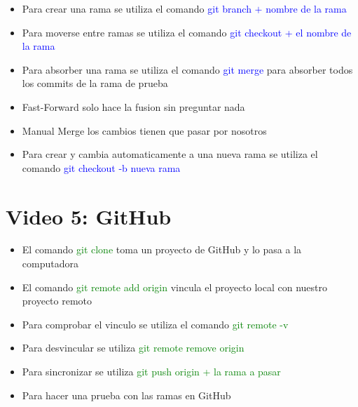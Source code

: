 \documentclass{article}
\begin{document}
	\begin{itemize}
	\item Para crear una rama se utiliza el comando \textcolor{blue}{git branch $+$ nombre de la rama}
	\item Para moverse entre ramas se utiliza el comando \textcolor{blue}{git checkout + el nombre de la rama}
	\item Para absorber una rama se utiliza el comando \textcolor{blue}{git merge} para absorber todos los commits de la rama de prueba
	\item Fast-Forward solo hace la fusion sin preguntar nada
	\item Manual Merge los cambios tienen que pasar por nosotros
	\item Para crear y cambia automaticamente a una nueva rama se utiliza el comando \textcolor{blue}{git checkout -b nueva rama}
	\end{itemize}

	\section{Video 5: GitHub}
	
	\begin{itemize}
		
	\item El comando \textcolor{green}{git clone} toma un proyecto de GitHub y lo pasa a la computadora
	\item El comando \textcolor{green}{git remote add origin} vincula el proyecto local con nuestro proyecto remoto
	\item Para comprobar el vinculo se utiliza el comando \textcolor{green}{git remote -v}
	\item Para desvincular se utiliza \textcolor{green}{git remote remove origin}
	\item Para sincronizar se utiliza \textcolor{green}{git push origin + la rama a pasar}
	\item Para hacer una prueba con las ramas en GitHub
	\end{itemize}
\end{document}

